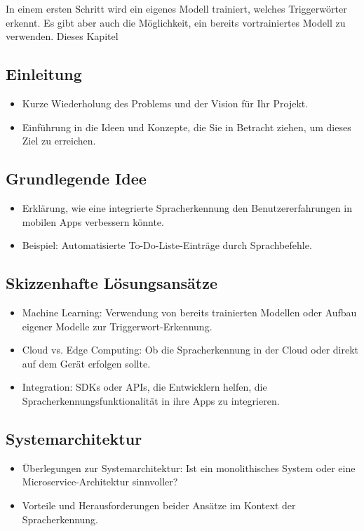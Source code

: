 \documentclass[11pt,a4paper]{article}
\begin{document}
In einem ersten Schritt wird ein eigenes Modell trainiert, welches Triggerwörter erkennt.
Es gibt aber auch die Möglichkeit, ein bereits vortrainiertes Modell zu verwenden. Dieses Kapitel
\subsection{Einleitung}
\begin{itemize}
    \item Kurze Wiederholung des Problems und der Vision für Ihr Projekt.
    \item Einführung in die Ideen und Konzepte, die Sie in Betracht ziehen, um dieses Ziel zu erreichen.
\end{itemize}

\subsection{Grundlegende Idee}
\begin{itemize}
    \item Erklärung, wie eine integrierte Spracherkennung den Benutzererfahrungen in mobilen Apps verbessern könnte.
    \item Beispiel: Automatisierte To-Do-Liste-Einträge durch Sprachbefehle.
\end{itemize}

\subsection{Skizzenhafte Lösungsansätze}
\begin{itemize}
    \item Machine Learning: Verwendung von bereits trainierten Modellen oder Aufbau eigener Modelle zur Triggerwort-Erkennung.
    \item Cloud vs. Edge Computing: Ob die Spracherkennung in der Cloud oder direkt auf dem Gerät erfolgen sollte.
    \item Integration: SDKs oder APIs, die Entwicklern helfen, die Spracherkennungsfunktionalität in ihre Apps zu integrieren.
\end{itemize}

\subsection{Systemarchitektur}
\begin{itemize}
    \item Überlegungen zur Systemarchitektur: Ist ein monolithisches System oder eine Microservice-Architektur sinnvoller?
    \item Vorteile und Herausforderungen beider Ansätze im Kontext der Spracherkennung.
\end{itemize}
\end{document}
